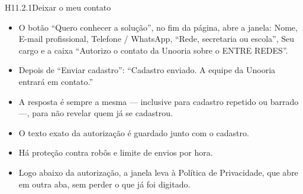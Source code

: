 \begin{historia}{H11.2.1}{Deixar o meu contato}{\pronto}
\aceite
\begin{itemize}
  \item O botão \enquote{Quero conhecer a solução}, no fim da página, abre a janela:
    Nome, E-mail profissional, Telefone / WhatsApp, \enquote{Rede, secretaria
    ou escola}, Seu cargo e a caixa \enquote{Autorizo o contato da Unooria
    sobre o ENTRE REDES}.
  \item Depois de \enquote{Enviar cadastro}: \enquote{Cadastro enviado. A
    equipe da Unooria entrará em contato.}
  \item A resposta é sempre a mesma --- inclusive para cadastro repetido ou
    barrado ---, para não revelar quem já se cadastrou.
  \item O texto exato da autorização é guardado junto com o cadastro.
  \item Há proteção contra robôs e limite de envios por hora.
  \item Logo abaixo da autorização, a janela leva à Política de Privacidade,
    que abre em outra aba, sem perder o que já foi digitado.
\end{itemize}
\end{historia}


